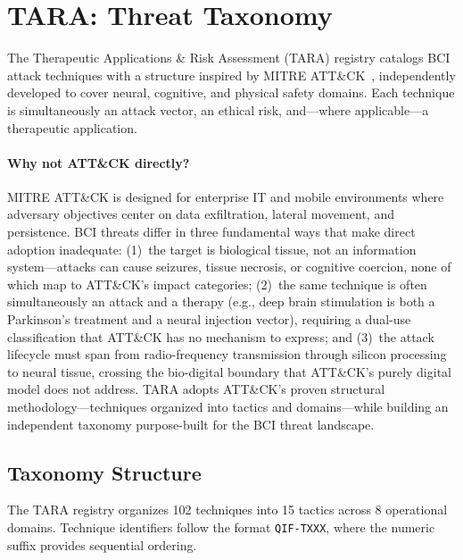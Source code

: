 
\section{TARA: Threat Taxonomy}
\label{sec:tara}

The Therapeutic Applications \& Risk Assessment (TARA) registry catalogs BCI
attack techniques with a structure inspired by MITRE
ATT\&CK~\cite{mitre2024attack}, independently developed to cover neural,
cognitive, and physical safety domains. Each
technique is simultaneously an attack vector, an ethical risk, and---where
applicable---a therapeutic application.

\paragraph{Why not ATT\&CK directly?}
MITRE ATT\&CK is designed for enterprise IT and mobile environments where
adversary objectives center on data exfiltration, lateral movement, and
persistence. BCI threats differ in three fundamental ways that make direct
adoption inadequate: (1)~the target is biological tissue, not an information
system---attacks can cause seizures, tissue necrosis, or cognitive coercion,
none of which map to ATT\&CK's impact categories; (2)~the same technique is
often simultaneously an attack and a therapy (e.g., deep brain stimulation is
both a Parkinson's treatment and a neural injection vector), requiring a
dual-use classification that ATT\&CK has no mechanism to express; and (3)~the
attack lifecycle must span from radio-frequency transmission through silicon
processing to neural tissue, crossing the bio-digital boundary that ATT\&CK's
purely digital model does not address. TARA adopts ATT\&CK's proven structural
methodology---techniques organized into tactics and domains---while building an
independent taxonomy purpose-built for the BCI threat landscape.

\subsection{Taxonomy Structure}

The TARA registry organizes 102 techniques into 15 tactics across 8 operational
domains. Technique identifiers follow the format \texttt{QIF-TXXX}, where the
numeric suffix provides sequential ordering.

